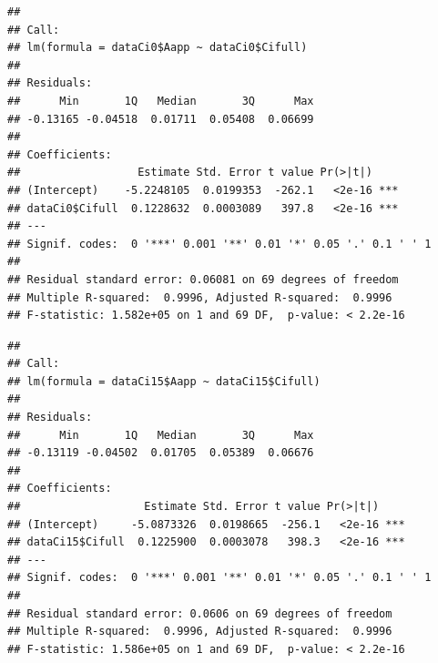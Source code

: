 \documentclass[
]{krantz}
\makeatletter
\newenvironment{Shaded}{\begin{snugshade}}{\end{snugshade}}
\newcommand{\DecValTok}[1]{\textcolor[rgb]{0.00,0.00,0.81}{#1}}
\newcommand{\KeywordTok}[1]{\textcolor[rgb]{0.13,0.29,0.53}{\textbf{#1}}}
\newcommand{\NormalTok}[1]{#1}
\newcommand{\OperatorTok}[1]{\textcolor[rgb]{0.81,0.36,0.00}{\textbf{#1}}}
\newcommand{\StringTok}[1]{\textcolor[rgb]{0.31,0.60,0.02}{#1}}
\newenvironment{kframe}{%
\medskip{}
\setlength{\fboxsep}{.8em}
 \def\at@end@of@kframe{}%
 \ifinner\ifhmode%
  \def\at@end@of@kframe{\end{minipage}}%
  \begin{minipage}{\columnwidth}%
 \fi\fi%
 \def\FrameCommand##1{\hskip\@totalleftmargin \hskip-\fboxsep
 \colorbox{shadecolor}{##1}\hskip-\fboxsep
     \hskip-\linewidth \hskip-\@totalleftmargin \hskip\columnwidth}%
 \MakeFramed {\advance\hsize-\width
   \@totalleftmargin\z@ \linewidth\hsize
   \@setminipage}}%
 {\par\unskip\endMakeFramed%
 \at@end@of@kframe}
\renewenvironment{Shaded}{\begin{kframe}}{\end{kframe}}
\makeatother
\begin{document}
\begin{verbatim}
## 
## Call:
## lm(formula = dataCi0$Aapp ~ dataCi0$Cifull)
## 
## Residuals:
##      Min       1Q   Median       3Q      Max 
## -0.13165 -0.04518  0.01711  0.05408  0.06699 
## 
## Coefficients:
##                  Estimate Std. Error t value Pr(>|t|)    
## (Intercept)    -5.2248105  0.0199353  -262.1   <2e-16 ***
## dataCi0$Cifull  0.1228632  0.0003089   397.8   <2e-16 ***
## ---
## Signif. codes:  0 '***' 0.001 '**' 0.01 '*' 0.05 '.' 0.1 ' ' 1
## 
## Residual standard error: 0.06081 on 69 degrees of freedom
## Multiple R-squared:  0.9996,	Adjusted R-squared:  0.9996 
## F-statistic: 1.582e+05 on 1 and 69 DF,  p-value: < 2.2e-16
\end{verbatim}

\begin{Shaded}
\end{Shaded}

\begin{verbatim}
## 
## Call:
## lm(formula = dataCi15$Aapp ~ dataCi15$Cifull)
## 
## Residuals:
##      Min       1Q   Median       3Q      Max 
## -0.13119 -0.04502  0.01705  0.05389  0.06676 
## 
## Coefficients:
##                   Estimate Std. Error t value Pr(>|t|)    
## (Intercept)     -5.0873326  0.0198665  -256.1   <2e-16 ***
## dataCi15$Cifull  0.1225900  0.0003078   398.3   <2e-16 ***
## ---
## Signif. codes:  0 '***' 0.001 '**' 0.01 '*' 0.05 '.' 0.1 ' ' 1
## 
## Residual standard error: 0.0606 on 69 degrees of freedom
## Multiple R-squared:  0.9996,	Adjusted R-squared:  0.9996 
## F-statistic: 1.586e+05 on 1 and 69 DF,  p-value: < 2.2e-16
\end{verbatim}

\begin{Shaded}
\end{Shaded}
\end{document}
